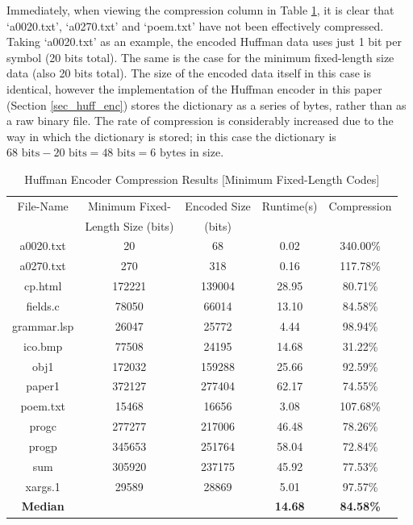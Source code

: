 \documentclass[12pt]{article}
\begin{document}
Immediately, when viewing the compression column in Table \ref{huff_enc_results_fl}, it is clear that `a0020.txt', `a0270.txt' and `poem.txt' have not been effectively compressed. Taking `a0020.txt' as an example, the encoded Huffman data uses just 1 bit per symbol (20 bits total). The same is the case for the minimum fixed-length size data (also 20 bits total). The size of the encoded data itself in this case is identical, however the implementation of the Huffman encoder in this paper (Section \ref{sec_huff_enc}) stores the dictionary as a series of bytes, rather than as a raw binary file. The rate of compression is considerably increased due to the way in which the dictionary is stored; in this case the dictionary is $68\text{ bits}-20\text{ bits}=48\text{ bits}=6\text{ bytes}$ in size. 

\begin{table}[H]
	\centering
	\begin{tabular}{| c | c | c | c | c |} 
		\hline
		File-Name & Minimum Fixed- & Encoded Size & Runtime(s) & Compression\\
		& Length Size (bits) & (bits) & & \\
		\hline
		a0020.txt & 20 & 68 & 0.02 & 340.00\%\\
		\hline
		a0270.txt & 270 & 318 & 0.16 & 117.78\%\\
		\hline
		cp.html & 172221 & 139004 & 28.95 & 80.71\%\\
		\hline
		fields.c & 78050 & 66014 & 13.10 & 84.58\%\\
		\hline
		grammar.lsp & 26047 & 25772 & 4.44 & 98.94\%\\
		\hline
		ico.bmp & 77508 & 24195 & 14.68 & 31.22\%\\
		\hline
		obj1 & 172032 & 159288 & 25.66 & 92.59\%\\
		\hline
		paper1 & 372127 & 277404 & 62.17 & 74.55\%\\
		\hline
		poem.txt & 15468 & 16656 & 3.08 & 107.68\%\\
		\hline
		progc & 277277 & 217006 & 46.48 & 78.26\%\\
		\hline
		progp & 345653 & 251764 & 58.04 & 72.84\%\\
		\hline
		sum & 305920 & 237175 & 45.92 & 77.53\%\\
		\hline
		xargs.1 & 29589 & 28869 & 5.01 & 97.57\%\\
		\Xhline{3\arrayrulewidth}
		\textbf{Median} & & & \textbf{14.68} & \textbf{84.58\%}\\
		\hline
	\end{tabular}
	\caption{Huffman Encoder Compression Results [Minimum Fixed-Length Codes]}
	\label{huff_enc_results_fl}
\end{table}
\end{document}

